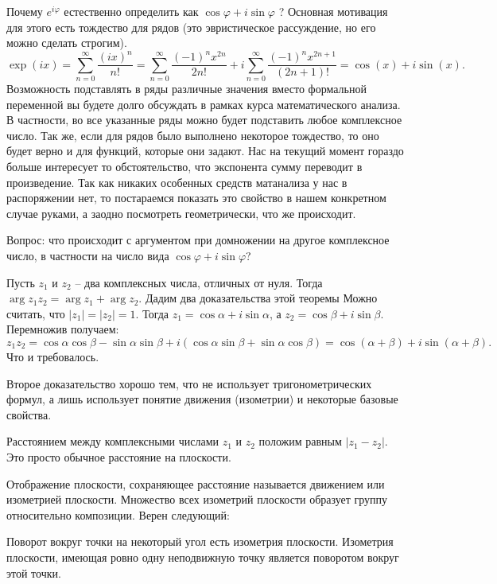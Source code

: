 Почему $e^{i\varphi}$ естественно определить как $\cos\varphi+i\sin \varphi$ ? Основная мотивация для этого есть тождество для рядов  (это эвристическое рассуждение, но его можно сделать строгим).
$$\exp(ix) = \sum_{n=0}^{\infty} \frac{(ix)^n}{n!}=\sum_{n=0}^{\infty} \frac{(-1)^n x^{2n}}{2n!} + i\sum_{n=0}^{\infty} \frac{(-1)^n x^{2n+1}}{(2n+1)!}= \cos(x) + i\sin(x).$$
Возможность подставлять в ряды различные значения вместо формальной переменной вы будете долго обсуждать в рамках курса математического анализа. В частности, во все указанные ряды можно будет подставить любое комплексное число. Так же, если для рядов было выполнено некоторое тождество, то оно будет верно и для функций, которые они задают.
Нас на текущий момент гораздо больше  интересует то обстоятельство, что экспонента сумму переводит в произведение. Так как никаких особенных средств матанализа у нас в распоряжении нет, то постараемся показать это свойство в нашем конкретном случае руками, а заодно посмотреть геометрически, что же происходит.


Вопрос: что происходит с аргументом при домножении на другое комплексное число, в частности на число вида $\cos \varphi + i \sin \varphi$? 

\thrm Пусть $z_1$ и $z_2$ -- два комплексных числа, отличных от нуля. Тогда $\arg z_1z_2= \arg z_1+ \arg z_2$.
\ethrm
Дадим два доказательства этой теоремы  Можно считать, что $|z_1|=|z_2|=1$. Тогда $z_1=\cos \alpha+i\sin \alpha$, а $z_2=\cos \beta + i\sin \beta$. Перемножив получаем:
$$z_1z_2=\cos \alpha \cos\beta - \sin\alpha \sin \beta+ i(\cos \alpha \sin\beta + \sin\alpha \cos \beta)= \cos (\alpha+\beta)+i\sin(\alpha+\beta).$$
Что и требовалось.
\endproof

Второе доказательство хорошо тем, что не использует тригонометрических формул, а лишь использует понятие движения (изометрии) и некоторые базовые свойства.


\dfn[Расстояние] Расстоянием между комплексными числами $z_1$ и $z_2$ положим равным $|z_1-z_2|$. Это просто обычное расстояние на плоскости.
\edfn

Отображение плоскости, сохраняющее расстояние называется движением или изометрией плоскости. Множество всех изометрий плоскости образует группу относительно композиции. Верен следующий:
\begin{fact} Поворот вокруг точки на некоторый угол есть изометрия плоскости. Изометрия плоскости, имеющая ровно
одну неподвижную точку является поворотом вокруг этой точки.
\end{fact}

